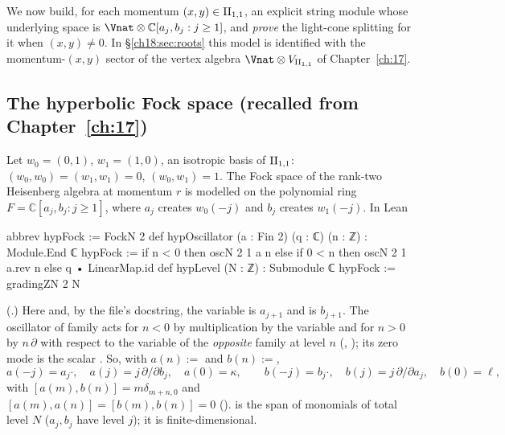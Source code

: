 We now build, for each momentum $(x,y)\in\mathrm{II}_{1,1}$, an explicit string module whose underlying space is
$\Vnat\otimes\mathbb C[a_j,b_j:j\ge1]$, and \emph{prove} the light-cone splitting for it when
$(x,y)\neq0$.  In \S\ref{ch18:sec:roots} this model is identified with the momentum-$(x,y)$ sector of the
vertex algebra $\Vnat\otimes V_{\chXVIIIII}$ of Chapter~\ref{ch:17}.

\subsection{The hyperbolic Fock space (recalled from Chapter~\ref{ch:17})}

Let $w_0=(0,1)$, $w_1=(1,0)$, an isotropic basis of $\mathrm{II}_{1,1}$: $(w_0,w_0)=(w_1,w_1)=0$, $(w_0,w_1)=1$.  The Fock
space of the rank-two Heisenberg algebra at momentum $r$ is modelled on the polynomial ring
$F=\mathbb C[a_j,b_j:j\ge1]$, where $a_j$ creates $w_0(-j)$ and $b_j$ creates $w_1(-j)$.  In Lean
\begin{leancode}
abbrev hypFock := FockN 2
def hypOscillator (a : Fin 2) (q : ℂ) (n : ℤ) : Module.End ℂ hypFock :=
  if n < 0 then oscN 2 1 a n
  else if 0 < n then oscN 2 1 a.rev n
  else q • LinearMap.id
def hypLevel (N : ℤ) : Submodule ℂ hypFock := gradingZN 2 N
\end{leancode}
(.)  Here 
and, by the file's docstring, the variable  is $a_{j+1}$ and  is $b_{j+1}$.  The
oscillator of family  acts for $n<0$ by multiplication by the variable  and for
$n>0$ by $n\,\partial$ with respect to the variable of the \emph{opposite} family  at level
$n$ (, ); its zero mode is the
scalar .  So, with $a(n):=$ and $b(n):=$,
\begin{equation*}
  a(-j)=a_j\cdot,\quad a(j)=j\,\partial/\partial b_j,\quad a(0)=\kappa,\qquad
  b(-j)=b_j\cdot,\quad b(j)=j\,\partial/\partial a_j,\quad b(0)=\ell,
\end{equation*}
with $[a(m),b(n)]=m\delta_{m+n,0}$ and $[a(m),a(n)]=[b(m),b(n)]=0$ ().
 is the span of monomials of total level $N$ ($a_j,b_j$ have level $j$); it is
finite-dimensional.

